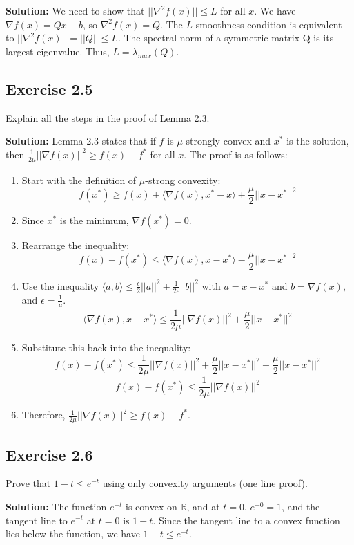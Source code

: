 \documentclass{article}
\begin{document}
\textbf{Solution:}
We need to show that $||\nabla^2 f(x)|| \leq L$ for all $x$.
We have $\nabla f(x) = Qx - b$, so $\nabla^2 f(x) = Q$.
The $L$-smoothness condition is equivalent to $||\nabla^2 f(x)|| = ||Q|| \leq L$. The spectral norm of a symmetric matrix Q is its largest eigenvalue. Thus, $L = \lambda_{max}(Q)$.

\subsection*{Exercise 2.5}
Explain all the steps in the proof of Lemma 2.3.

\textbf{Solution:}
Lemma 2.3 states that if $f$ is $\mu$-strongly convex and $x^*$ is the solution, then $\frac{1}{2\mu} ||\nabla f(x)||^2 \geq f(x) - f^*$ for all $x$.
The proof is as follows:

\begin{enumerate}
    \item Start with the definition of $\mu$-strong convexity:
    \[
    f(x^*) \geq f(x) + \langle \nabla f(x), x^* - x \rangle + \frac{\mu}{2} ||x - x^*||^2
    \]
    \item Since $x^*$ is the minimum, $\nabla f(x^*) = 0$.
    \item Rearrange the inequality:
    \[
    f(x) - f(x^*) \leq \langle \nabla f(x), x - x^* \rangle - \frac{\mu}{2} ||x - x^*||^2
    \]
    \item Use the inequality $\langle a, b \rangle \leq \frac{\epsilon}{2} ||a||^2 + \frac{1}{2\epsilon} ||b||^2$ with $a = x - x^*$ and $b = \nabla f(x)$, and $\epsilon = \frac{1}{\mu}$.
    \[
    \langle \nabla f(x), x - x^* \rangle \leq \frac{1}{2\mu} ||\nabla f(x)||^2 + \frac{\mu}{2} ||x - x^*||^2
    \]
    \item Substitute this back into the inequality:
    \[
     f(x) - f(x^*) \leq \frac{1}{2\mu} ||\nabla f(x)||^2 + \frac{\mu}{2} ||x - x^*||^2 - \frac{\mu}{2} ||x - x^*||^2
    \]
    \[
    f(x) - f(x^*) \leq \frac{1}{2\mu} ||\nabla f(x)||^2
    \]
    \item Therefore, $\frac{1}{2\mu} ||\nabla f(x)||^2 \geq f(x) - f^*$.
\end{enumerate}

\subsection*{Exercise 2.6}
Prove that $1 - t \leq e^{-t}$ using only convexity arguments (one line proof).

\textbf{Solution:}
The function $e^{-t}$ is convex on $\mathbb{R}$, and at $t=0$, $e^{-0}=1$, and the tangent line to $e^{-t}$ at $t=0$ is $1-t$. Since the tangent line to a convex function lies below the function, we have $1-t \leq e^{-t}$.
\end{document}
